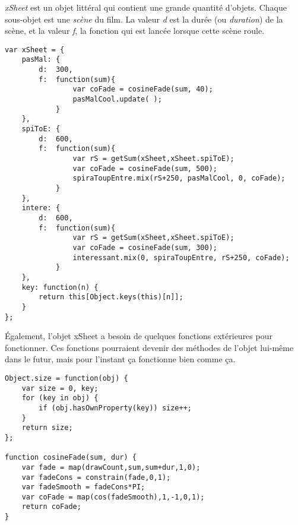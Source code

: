 \textit{xSheet} est un objet littéral qui contient une grande quantité d'objets. Chaque sous-objet est une \textit{scène} du film. La valeur \textit{d} est la durée (ou \textit{duration}) de la scène, et la valeur \textit{f}, la fonction qui est lancée lorsque cette scène roule. 
\begin{lstlisting}
var xSheet = {
    pasMal: {
        d:  300,
        f:  function(sum){
                var coFade = cosineFade(sum, 40);
                pasMalCool.update( );
            }
    },
    spiToE: {
        d:  600,
        f:  function(sum){
                var rS = getSum(xSheet,xSheet.spiToE);
                var coFade = cosineFade(sum, 500);
                spiraToupEntre.mix(rS+250, pasMalCool, 0, coFade);
            }
    },
    intere: {
        d:  600,
        f:  function(sum){
                var rS = getSum(xSheet,xSheet.spiToE);
                var coFade = cosineFade(sum, 300);
                interessant.mix(0, spiraToupEntre, rS+250, coFade);
            }
    },
    key: function(n) {
        return this[Object.keys(this)[n]];
    }
};
\end{lstlisting}

Également, l'objet xSheet a besoin de quelques fonctions extérieures pour fonctionner. Ces fonctions pourraient devenir des méthodes de l'objet lui-même dans le futur, mais pour l'instant ça fonctionne bien comme ça.
\begin{lstlisting}
Object.size = function(obj) {
    var size = 0, key;
    for (key in obj) {
        if (obj.hasOwnProperty(key)) size++;
    }
    return size;
};

function cosineFade(sum, dur) {
    var fade = map(drawCount,sum,sum+dur,1,0);
    var fadeCons = constrain(fade,0,1);
    var fadeSmooth = fadeCons*PI;
    var coFade = map(cos(fadeSmooth),1,-1,0,1);
    return coFade;
}
\end{lstlisting}
